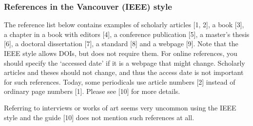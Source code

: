 \documentclass[english, 12pt, a4paper, sci, utf8, a-2b, online]{aaltothesis}
\begin{document}
\subsubsection*{References in the Vancouver (IEEE) style}

The reference list below contains examples of scholarly articles [1, 2], a book 
[3], a chapter in a book with editors [4], a conference publication [5], a 
master’s thesis [6], a doctoral dissertation [7], a standard [8] and a webpage 
[9]. Note that the IEEE style allows DOIs, but does not require them. For online
references, you should specify the ‘accessed date’ if it is a webpage that might
change. Scholarly articles and theses should not change, and thus the access 
date is not important for such references. Today, some periodicals use article 
numbers [2] instead of ordinary page numbers [1]. Please see [10] for more 
details.

Referring to interviews or works of art seems very uncommon using the IEEE style
and the guide [10] does not mention such references at all.
\end{document}
